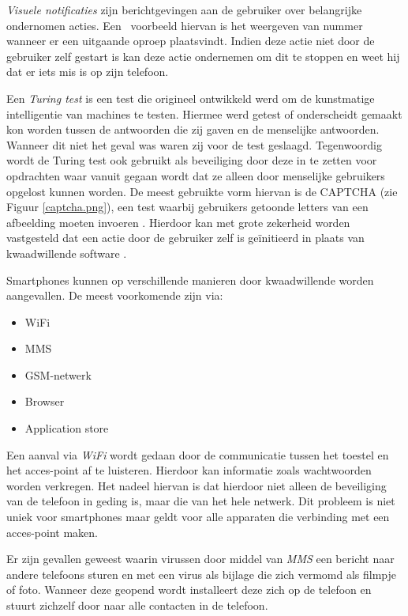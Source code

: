 \emph{Visuele notificaties} zijn berichtgevingen aan de gebruiker over belangrijke ondernomen acties. Een  voorbeeld hiervan is het weergeven van nummer wanneer er een uitgaande oproep plaatsvindt. Indien deze actie niet door de gebruiker zelf gestart is kan deze actie ondernemen om dit te stoppen en weet hij dat er iets mis is op zijn telefoon. 


Een \emph{Turing test} is een test die origineel ontwikkeld werd om de kunstmatige intelligentie van machines te testen. Hiermee werd getest of onderscheidt gemaakt kon worden tussen de antwoorden die zij gaven en de menselijke antwoorden. Wanneer dit niet het geval was waren zij voor de test geslaagd. Tegenwoordig wordt de Turing test ook gebruikt als beveiliging door deze in te zetten voor opdrachten waar vanuit gegaan wordt dat ze alleen door menselijke gebruikers opgelost kunnen worden. De meest gebruikte vorm hiervan is de CAPTCHA (zie Figuur \ref{captcha.png}), een test waarbij gebruikers getoonde letters van een afbeelding moeten invoeren \citep{von2003captcha}. Hierdoor kan met grote zekerheid worden vastgesteld dat een actie door de gebruiker zelf is geïnitieerd in plaats van kwaadwillende software \citep{becher2011mobile}. 

Smartphones kunnen op verschillende manieren door kwaadwillende worden aangevallen. De meest voorkomende zijn via:

\begin{itemize}
   \item WiFi
   \item MMS
   \item GSM-netwerk
   \item Browser
   \item Application store
\end{itemize}

Een aanval via \emph{WiFi} wordt gedaan door de communicatie tussen het toestel en het acces-point af te luisteren. Hierdoor kan informatie zoals wachtwoorden worden verkregen. Het nadeel hiervan is dat hierdoor niet alleen de beveiliging van de telefoon in geding is, maar die van het hele netwerk. Dit probleem is niet uniek voor smartphones maar geldt voor alle apparaten die verbinding met een acces-point maken.  

Er zijn gevallen geweest waarin virussen door middel van \emph{MMS} een bericht naar andere telefoons sturen en met een virus als bijlage die zich vermomd als filmpje of foto. Wanneer deze geopend wordt installeert deze zich op de telefoon en stuurt zichzelf door naar alle contacten in de telefoon. 

